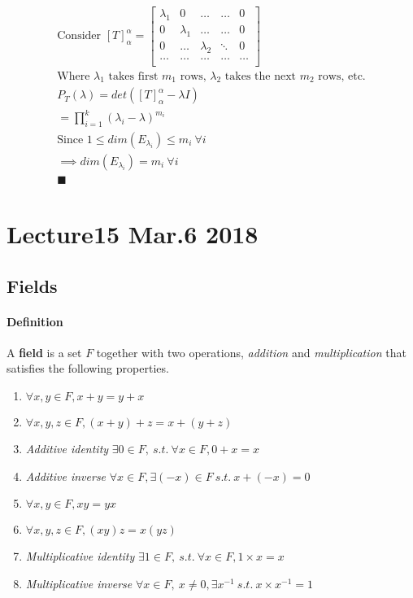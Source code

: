 \documentclass[11pt]{article}
\newcommand{\tmat}[3]{[{#1}]_{{#2}}^{{#3}}}
\newcommand{\definition}[0]{\paragraph{Definition}}
\begin{document}
	\begin{multline*}
		\\
		\text{Consider } \tmat{T}{\alpha}{\alpha} = \begin{bmatrix}
			\lambda_1 & 0 & \dots & \dots & 0 \\
			0 & \lambda_1 & \dots & \dots & 0 \\
			0 & \dots & \lambda_2 & \ddots & 0 \\
			\dots & \dots & \dots & \dots & \dots \\
		\end{bmatrix} \\
		\text{Where $\lambda_1$ takes first $m_1$ rows, $\lambda_2$ takes the next $m_2$ rows, etc.}\\
		P_T(\lambda) = det(\tmat{T}{\alpha}{\alpha} - \lambda I) \\
		= \prod_{i=1}^k {(\lambda_i - \lambda)^{m_i}} \\
		\text{Since } 1 \leq dim(E_{\lambda_i}) \leq m_i\ \forall i \\
		\implies dim(E_{\lambda_i}) = m_i\ \forall i \\
		\blacksquare
	\end{multline*}
	
	\section{Lecture15 Mar.6 2018}
	\subsection{Fields}
	\definition A \textbf{field} is a set $F$ together with two operations, \emph{addition} and \emph{multiplication} that satisfies the following properties.
	\begin{enumerate}
		\item $\forall x, y \in F, x + y = y + x$
		\item $\forall x, y, z \in F, (x + y) + z = x + (y + z)$
		\item \emph{Additive identity} $\exists 0 \in F,\ s.t.\ \forall x \in F, 0+x=x$
		\item \emph{Additive inverse} $\forall x \in F, \exists (-x) \in F\ s.t.\ x + (-x) = 0$
		\item $\forall x,y \in F, xy=yx$
		\item $\forall x,y,z \in F, (xy)z = x(yz)$
		\item \emph{Multiplicative identity} $\exists 1 \in F,\ s.t.\ \forall x \in F, 1\times x = x$
		\item \emph{Multiplicative inverse} $\forall x \in F,\ x \neq 0, \exists x^{-1}\ s.t.\ x\times x^{-1} =1$
	\end{enumerate}
	
\end{document}
